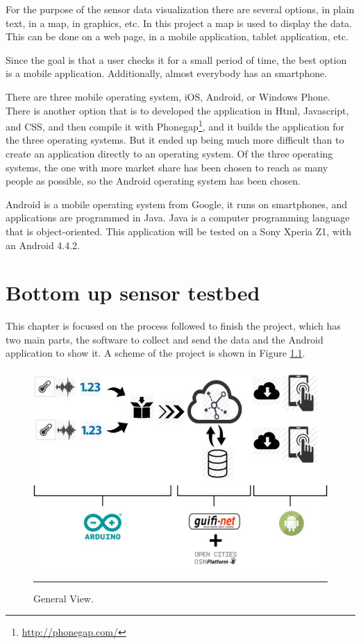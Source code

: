 \documentclass[12pt, a4paper,twoside]{tesi_upf}
\begin{document}
    For the purpose of the sensor data visualization there are several options, in plain text, in a map, in graphics, etc. In this project a map is used to display the data. This can be done on a web page, in a mobile application, tablet application, etc.
    
    Since the goal is that a user checks it for a small period of time, the best option is a mobile application. Additionally, almost everybody has an smartphone.
    
    There are three mobile operating system, iOS, Android, or Windows Phone. There is another option that is to developed the application in Html, Javascript, and CSS, and then compile it with Phonegap\footnote{\url{http://phonegap.com/}}, and it builds the application for the three operating systems. But it ended up being much more difficult than to create an application directly to an operating system.
    Of the three operating systems, the one with more market share has been chosen to reach as many people as possible, so the Android operating system has been chosen.
      
    Android is a mobile operating system from Google, it runs on smartphones, and applications are programmed in Java. Java is a computer programming language that is object-oriented.    
    This application will be tested on a Sony Xperia Z1, with an Android 4.4.2.

\chapter{Bottom up sensor testbed}
\label{Chapter4}

  This chapter is focused on the process followed to finish the project, which has two main parts, the software to collect and send the data and the Android application to show it. A scheme of the project is shown in Figure \ref{fig:reportGeneralView}.
  
  \begin{figure}[htbp]
    \centering
        \includegraphics[scale=0.5]{./Figures/reportGeneralView.jpg}
        \rule{25em}{0.5pt}
    \caption[General View]{General View.}
    \label{fig:reportGeneralView}
  \end{figure}
  
\end{document}
